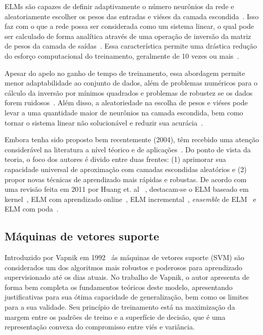 \documentclass[conference]{IEEEtran}
\begin{document}
	ELMs são capazes de definir adaptivamente o número neurônios da rede e aleatoriamente escolher os pesos das entradas e viéses da camada escondida~\cite{huang2006extreme}. Isso faz com o que a rede possa ser considerada como um sistema linear, o qual pode ser calculado de forma analítica através de uma operação de inversão da matriz de pesos da camada de saídas~\cite{huang2006extreme}. Essa característica permite uma drástica redução do esforço computacional do treinamento, geralmente de 10 vezes ou mais~\cite{deng2010research}. 
	
	Apesar do apelo no ganho de tempo de treinamento, essa abordagem permite menor adaptabilidade ao conjunto de dados, além de problemas numéricos para o cálculo da inversão por mínimos quadrados e problemas de robustez se os dados forem ruidosos~\cite{ding2015extreme}. Além disso, a aleatoriedade na  escolha de pesos e viéses pode levar a uma quantidade maior de neurônios na camada escondida, bem como tornar o sistema linear não solucionável e reduzir sua acurácia~\cite{wang2011study}.
	
	Embora tenha sido proposto bem recentemente (2004), têm recebido uma atenção considerável na literatura a nível téorico e de aplicações~\cite{huang2011survey}. Do ponto de vista da teoria, o foco dos autores é divido entre duas frentes: (1) aprimorar sua capacidade universal de aproximação com camadas escondidas aleatórios e (2) propor novas técnicas de aprendizado mais rápidas e robustas. De acordo com uma revisão feita em 2011 por Huang et. al ~\cite{huang2011survey}, destacam-se o ELM baseado em kernel~\cite{huang2011extreme},  ELM com aprendizado online~\cite{liang2006fast, zhang2018survey}, ELM incremental~\cite{huang2008enhanced}, \textit{ensemble} de ELM~\cite{sun2008sales, van2009adaptive, lan2009ensemble} e ELM com poda~\cite{rong2008fast}.
	
	   
    
	\subsection{Máquinas de vetores suporte}
	Introduzido por Vapnik em 1992~\cite{boser1992training} ás máquinas de vetores suporte (SVM) são considerados um dos algoritmos mais robustos e poderosos para aprendizado supervisionado até os dias atuais. No trabalho de Vapnik, o autor apresenta de forma bem completa os fundamentos teóricos deste modelo, apresentando justificativas para sua ótima capacidade de generalização, bem como os limites para a sua validade. Seu princípio de treinamento está na maximização da margem entre os padrões de treino e a superfície de decisão, que é uma representação convexa do compromisso entre viés e variância.
	
\end{document}
